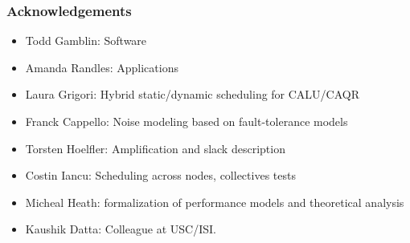 \begin{frame}[label=acks]
\frametitle{Acknowledgements}
\begin{itemize}
\item Todd Gamblin: Software
\item Amanda Randles: Applications
\item Laura Grigori: Hybrid static/dynamic scheduling for CALU/CAQR
\item Franck Cappello: Noise modeling based on fault-tolerance models
\item Torsten Hoelfler: Amplification and slack description
\item Costin Iancu: Scheduling across nodes, collectives tests
\item Micheal Heath: formalization of performance models and theoretical analysis
\item Kaushik Datta: Colleague at USC/ISI.
\end{itemize}
\end{frame}


